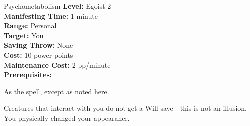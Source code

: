 {Psychometabolism}
{
	\textbf{Level:}
	Egoist 2\\
	\textbf{Manifesting Time:}
	1 minute\\
	\textbf{Range:}
	Personal\\
	\textbf{Target:}
	You\\
	\textbf{Saving Throw:}
	None\\
	\textbf{Cost:}
	10 power points\\
	\textbf{Maintenance Cost:}
	2 pp/minute\\
	\textbf{Prerequisites:}
	\\
}
{
	As the  spell, except as noted here.

	Creatures that interact with you do not get a Will save---this is not an illusion. You physically changed your appearance.
}